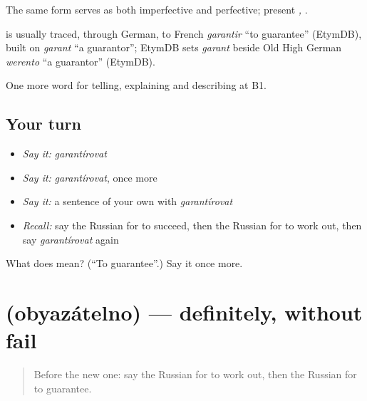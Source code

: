 The same form serves as both imperfective and perfective; present \emph{, }.

\begin{cousinweb}
\textbf{} is usually traced, through German, to French \emph{garantir} \textquotedblleft{}to guarantee\textquotedblright{} (EtymDB), built on \emph{garant} \textquotedblleft{}a guarantor\textquotedblright{}; EtymDB sets \emph{garant} beside Old High German \emph{werento} \textquotedblleft{}a guarantor\textquotedblright{} (EtymDB).
\end{cousinweb}

\begin{grammarlens}[title={What you've built}]
One more word for telling, explaining and describing at B1.
\end{grammarlens}

\subsection*{Your turn}
\begin{itemize}
\raggedright
  \item \emph{Say it:} \emph{garantírovat}
  \item \emph{Say it:} \emph{garantírovat}, once more
  \item \emph{Say it:} a sentence of your own with \emph{garantírovat}
  \item \emph{Recall:} say the Russian for to succeed, then the Russian for to work out, then say \emph{garantírovat} again
\end{itemize}

\begin{tcolorbox}[breakable,colback=teal!4,colframe=teal!35!black,title={Before you move on}]
What does  mean? (\textquotedblleft{}To guarantee\textquotedblright{}.) Say it once more.
\end{tcolorbox}
\section[\texorpdfstring{\ru{обязательно} (obyazátelno)}{обязательно (obyazátelno)}]{ (obyazátelno) — definitely, without fail}

\label{lesson:RU-C375-obyazatelno}



\begin{quote}
Before the new one: say the Russian for to work out, then the Russian for to guarantee.
\end{quote}

